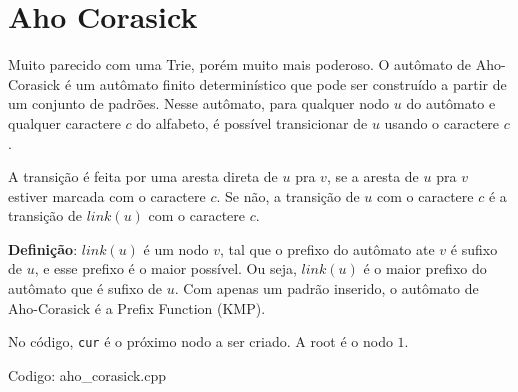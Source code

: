 \documentclass[10pt, a4paper, oneside]{book}
\begin{document}
\section{Aho Corasick}


Muito parecido com uma Trie, porém muito mais poderoso. O autômato de Aho-Corasick é um autômato finito determinístico que pode ser construído a partir de um conjunto de padrões. Nesse autômato, para qualquer nodo $u$ do autômato e qualquer caractere $c$ do alfabeto, é possível transicionar de $u$ usando o caractere $c$.



A transição é feita por uma aresta direta de $u$ pra $v$, se a aresta de $u$ pra $v$ estiver marcada com o caractere $c$. Se não, a transição de $u$ com o caractere $c$ é a transição de $link(u)$ com o caractere $c$.



\textbf{Definição}: $link(u)$ é um nodo $v$, tal que o prefixo do autômato ate $v$ é sufixo de $u$, e esse prefixo é o maior possível. Ou seja, $link(u)$ é o maior prefixo do autômato que é sufixo de $u$. Com apenas um padrão inserido, o autômato de Aho-Corasick é a Prefix Function (KMP).



No código, \texttt{cur} é o próximo nodo a ser criado. A root é o nodo $1$.
\hfill

Codigo: aho\_corasick.cpp
\end{document}
